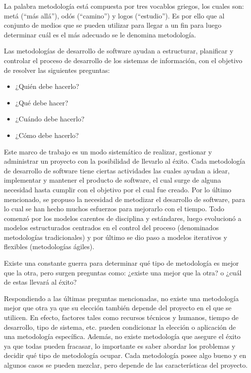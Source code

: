 La palabra metodología está compuesta por tres vocablos griegos, los cuales son: metá (``más allá''), odós (``camino'') y logos (``estudio''). Es por ello que al conjunto de medios que se pueden utilizar para llegar a un fin para luego determinar cuál es el más adecuado se le denomina metodología.

Las metodologías de desarrollo de software ayudan a estructurar, planificar y controlar el proceso de desarrollo de los sistemas de información, con el objetivo de resolver las siguientes preguntas:

\begin{itemize}
    \item ¿Quién debe hacerlo?
    \item ¿Qué debe hacer?
    \item ¿Cuándo debe hacerlo?
    \item ¿Cómo debe hacerlo?
\end{itemize}

Este marco de trabajo es un modo sistemático de realizar, gestionar y administrar un proyecto con la posibilidad de llevarlo al éxito. Cada metodología de desarrollo de software tiene ciertas actividades las cuales ayudan a idear, implementar y mantener el producto de software, el cual surge de alguna necesidad hasta cumplir con el objetivo por el cual fue creado. Por lo último mencionado, se propuso la necesidad de metodizar el desarrollo de software, para lo cual se han hecho muchos esfuerzos para mejorarlo con el tiempo. Todo comenzó por los modelos carentes de disciplina y estándares, luego evolucionó a modelos estructurados centrados en el control del proceso (denominados metodologías tradicionales) y por último se dio paso a modelos iterativos y flexibles (metodologías ágiles).

Existe una constante guerra para determinar qué tipo de metodología es mejor que la otra, pero surgen preguntas como: ¿existe una mejor que la otra? o ¿cuál de estas llevará al éxito? 

Respondiendo a las últimas preguntas mencionadas, no existe una metodología mejor que otra ya que su elección también depende del proyecto en el que se utilicen. En efecto, factores tales como recursos técnicos y humanos, tiempo de desarrollo, tipo de sistema, etc. pueden condicionar la elección o aplicación de una metodología específica. Además, no existe metodología que asegure el éxito ya que todas pueden fracasar, lo importante es saber abordar los problemas y decidir qué tipo de metodología ocupar. Cada metodología posee algo bueno y en algunos casos se pueden mezclar, pero depende de las características del proyecto.

